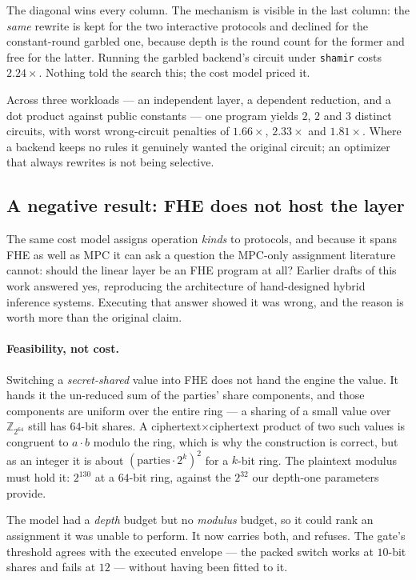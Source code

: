 \documentclass[11pt]{article}
\newcommand{\bt}[1]{\texttt{#1}}
\begin{document}
The diagonal wins every column. The mechanism is visible in the last column:
the \emph{same} rewrite is kept for the two interactive protocols and declined
for the constant-round garbled one, because depth is the round count for the
former and free for the latter. Running the garbled backend's circuit under
\bt{shamir} costs $2.24\times$. Nothing told the search this; the cost model
priced it.

Across three workloads --- an independent layer, a dependent reduction, and a
dot product against public constants --- one program yields $2$, $2$ and $3$
distinct circuits, with worst wrong-circuit penalties of $1.66\times$,
$2.33\times$ and $1.81\times$. Where a backend keeps no rules it genuinely
wanted the original circuit; an optimizer that always rewrites is not being
selective.

\subsection{A negative result: FHE does not host the layer}\label{sec:assign}

The same cost model assigns operation \emph{kinds} to protocols, and because
it spans FHE as well as MPC it can ask a question the MPC-only assignment
literature cannot: should the linear layer be an FHE program at all? Earlier
drafts of this work answered yes, reproducing the architecture of hand-designed
hybrid inference systems. Executing that answer showed it was wrong, and the
reason is worth more than the original claim.

\paragraph{Feasibility, not cost.} Switching a \emph{secret-shared} value into
FHE does not hand the engine the value. It hands it the un-reduced sum of the
parties' share components, and those components are uniform over the entire
ring --- a sharing of a small value over $\mathbb{Z}_{2^{64}}$ still has $64$-bit
shares. A ciphertext$\times$ciphertext product of two such values is congruent
to $a\cdot b$ modulo the ring, which is why the construction is correct, but as
an integer it is about $(\text{parties}\cdot 2^{k})^2$ for a $k$-bit ring. The
plaintext modulus must hold it: $2^{130}$ at a $64$-bit ring, against the
$2^{32}$ our depth-one parameters provide.

The model had a \emph{depth} budget but no \emph{modulus} budget, so it could
rank an assignment it was unable to perform. It now carries both, and refuses.
The gate's threshold agrees with the executed envelope --- the packed switch
works at $10$-bit shares and fails at $12$ --- without having been fitted to it.
\end{document}
